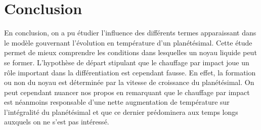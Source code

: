 \documentclass[10pt,a4paper]{article}
\numberwithin{equation}{section}
\begin{document}
\section{Conclusion}
En conclusion, on a pu étudier l'influence des différents termes apparaissant dans le modèle gouvernant l'évolution en température d'un planétésimal. Cette étude permet de mieux comprendre les conditions dans lesquelles un noyau liquide peut se former. L'hypothèse de départ stipulant que le chauffage par impact joue un rôle important dans la différentiation est cependant fausse. En effet, la formation ou non du noyau est déterminée par la vitesse de croissance du planétésimal. On peut cependant nuancer nos propos en remarquant que le chauffage par impact est néanmoins responsable d'une nette augmentation de température sur l'intégralité du planétésimal et que ce dernier prédominera aux temps longs auxquels on ne s'est pas intéressé.


\newpage

 
\end{document}
